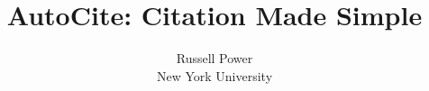 \documentclass[letterpaper,twocolumn,10pt]{article}
\newcommand{\name}{AutoCite\xspace}
\begin{document}
\date{}

\title{\sffamily\bfseries{\name}: Citation Made Simple}
\author{Russell Power \\ New York University}

 
\maketitle





\begin{footnotesize}


\end{footnotesize}
\end{document}
